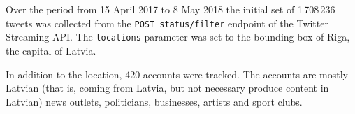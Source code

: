 \documentclass{IOS-Book-Article}
\newcommand{\hl}[1]{#1}
\begin{document}
Over the period from 15 April 2017 to \hl{8 May 2018} the initial set of \hl{1\,708\,236} tweets was collected from the \texttt{POST status/filter} endpoint of the Twitter Streaming API.%
%
%
The \texttt{locations} parameter was set to the bounding box of Riga, the capital of Latvia.%
%

In addition to the location, 420 accounts were tracked.%
%
The accounts are mostly Latvian (that is, coming from Latvia, but not necessary produce content in Latvian) news outlets, politicians, businesses, artists and sport clubs. 



\end{document}
